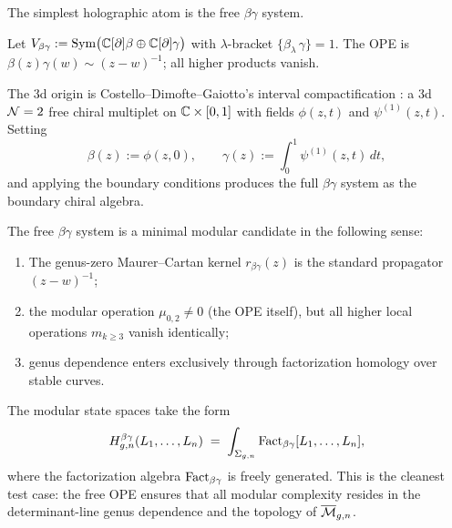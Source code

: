 The simplest holographic atom is the free $\beta\gamma$ system.

\begin{definition}
Let $V_{\beta\gamma} := \operatorname{Sym}\bigl(\mathbb C[\partial]\beta \oplus \mathbb C[\partial]\gamma\bigr)$
with $\lambda$-bracket $\{\beta_\lambda\,\gamma\} = 1$. The OPE is
$\beta(z)\gamma(w) \sim (z-w)^{-1}$; all higher products vanish.
\end{definition}

The 3d origin is Costello--Dimofte--Gaiotto's interval compactification \cite{CDG20}:
a 3d $\mathcal N=2$ free chiral multiplet on $\mathbb C \times [0,1]$ with fields $\phi(z,t)$ and
$\psi^{(1)}(z,t)$. Setting
\begin{equation}
\beta(z) := \phi(z,0),
\qquad
\gamma(z) := \int_0^1 \psi^{(1)}(z,t)\,dt,
\end{equation}
and applying the boundary conditions produces the full $\beta\gamma$ system as the
boundary chiral algebra.

\begin{proposition}
The free $\beta\gamma$ system is a minimal modular candidate in the following sense:
\begin{enumerate}[label=\textup{(\roman*)}]
\item The genus-zero Maurer--Cartan kernel $r_{\beta\gamma}(z)$ is the standard propagator
 $(z-w)^{-1}$;
\item the modular operation $\mu_{0,2} \neq 0$ (the OPE itself), but all higher local
 operations $m_{k \geq 3}$ vanish identically;
\item genus dependence enters exclusively through factorization homology over stable curves.
\end{enumerate}
\end{proposition}

The modular state spaces take the form
\begin{equation}
H_{g,n}^{\beta\gamma}(L_1,\dots,L_n)
\;=\;
\int_{\Sigma_{g,n}} \operatorname{Fact}_{\beta\gamma}[L_1,\dots,L_n],
\end{equation}
where the factorization algebra $\operatorname{Fact}_{\beta\gamma}$ is freely generated. This is the
cleanest test case: the free OPE ensures that all modular complexity resides in the
determinant-line genus dependence and the topology of $\overline{\mathcal M}_{g,n}$.

